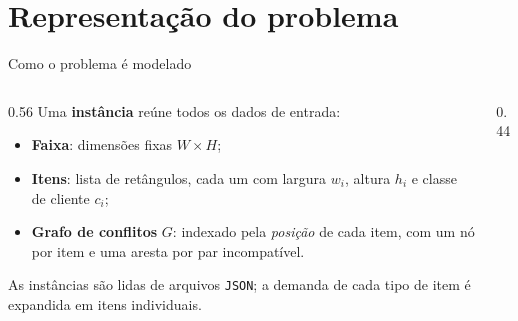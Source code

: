 \documentclass[aspectratio=169]{beamer}
\begin{document}
\section{Representação do problema}

\begin{frame}{Como o problema é modelado}
  \begin{columns}
    \begin{column}{0.56\textwidth}
      Uma \textbf{instância} reúne todos os dados de entrada:
      \begin{itemize}
        \item \textbf{Faixa}: dimensões fixas $W \times H$;
        \item \textbf{Itens}: lista de retângulos, cada um com largura $w_i$,
              altura $h_i$ e classe de cliente $c_i$;
        \item \textbf{Grafo de conflitos} $G$: indexado pela \emph{posição} de
              cada item, com um nó por item e uma aresta por par incompatível.
      \end{itemize}
      \vspace{0.4em}
      As instâncias são lidas de arquivos \texttt{JSON}; a demanda de cada tipo
      de item é expandida em itens individuais.
    \end{column}
    \begin{column}{0.44\textwidth}
      \centering
    \end{column}
  \end{columns}
\end{frame}
\end{document}
